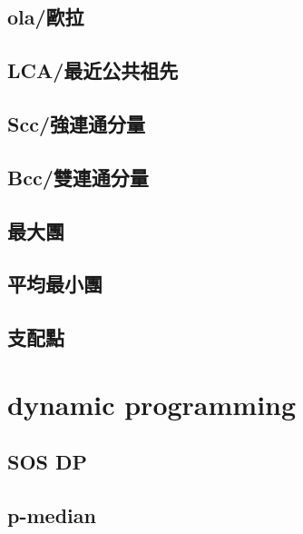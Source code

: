 \documentclass[a4paper,10pt,twocolumn,oneside]{article}
\begin{document}
    \subsection{ola/歐拉}
    

    \subsection{LCA/最近公共祖先}
    


    \subsection{Scc/強連通分量}
    

    \subsection{Bcc/雙連通分量}
    

    \subsection{最大團}
    

    \subsection{平均最小團}
    

    \subsection{支配點}
    


\section{dynamic programming}
    \subsection{SOS DP}
    

    \subsection{p-median}
    
\end{document}
